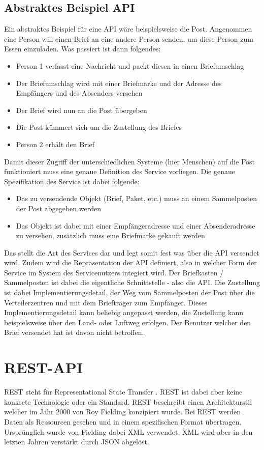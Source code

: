 \documentclass[bachelor, german ]{hgbthesis}
\begin{document}
\subsection{Abstraktes Beispiel API}
Ein abstraktes Beispiel für eine API wäre beispielsweise die Post. Angenommen eine Person will einen Brief an eine andere Person senden, um diese Person zum Essen einzuladen. Was passiert ist dann folgendes:
\begin{itemize}
 \item Person 1 verfasst eine Nachricht und packt diesen in einen Briefumschlag
 \item Der Briefumschlag wird mit einer Briefmarke und der Adresse des Empfängers und des Absenders versehen
 \item Der Brief wird nun an die Post übergeben
 \item Die Post kümmert sich um die Zustellung des Briefes
 \item Person 2 erhält den Brief
\end{itemize}

Damit dieser Zugriff der unterschiedlichen Systeme (hier Menschen) auf die Post funktioniert muss eine genaue Definition des Service vorliegen. Die genaue Spezifikation des Service ist dabei folgende:
\begin{itemize}
 \item Das zu versendende Objekt (Brief, Paket, etc.) muss an einem Sammelposten der Post abgegeben werden
 \item Das Objekt ist dabei mit einer Empfängeradresse und einer Absenderadresse zu versehen, zusätzlich muss eine Briefmarke gekauft werden
\end{itemize}
Das stellt die Art des Services dar und legt somit fest was über die API versendet wird. Zudem wird die Repräsentation der API definiert, also in welcher Form der Service im System des Servicenutzers integiert wird.
Der Briefkasten / Sammelposten ist dabei die eigentliche Schnittstelle - also die API. Die Zustellung ist dabei Implementierungsdetail, der Weg vom Sammelposten der Post über die Verteilerzentren und mit dem Briefträger zum Empfänger.
Dieses Implementierungsdetail kann beliebig angepasst werden, die Zustellung kann beispielsweise über den Land- oder Luftweg erfolgen. Der Benutzer welcher den Brief versendet hat ist davon nicht betroffen.

\section{REST-API}
REST steht für Representational State Transfer \cite{wheeler1952use}. REST ist dabei aber keine konkrete Technologie oder ein Standard. REST beschreibt einen Architekturstil welcher im Jahr 2000 von Roy Fielding konzipiert wurde.
Bei REST werden Daten als Ressourcen gesehen und in einem spezifischen Format übertragen. Ursprünglich wurde von Fielding dabei XML verwendet. XML wird aber in den letzten Jahren verstärkt durch JSON abgelöst.
\newline
\end{document}
